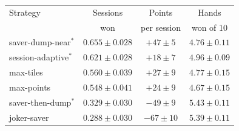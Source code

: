 \begin{tabular}{@{}lccc@{}}\toprule
Strategy & Sessions & Points & Hands\\
 & won & per session & won of 10\\\midrule
saver-dump-near$^*$ & $0.655\pm0.028$ & $+47\pm5$ & $4.76\pm0.11$\\
session-adaptive$^*$ & $0.621\pm0.028$ & $+18\pm7$ & $4.96\pm0.09$\\
max-tiles & $0.560\pm0.039$ & $+27\pm9$ & $4.77\pm0.15$\\
max-points & $0.548\pm0.041$ & $+24\pm9$ & $4.67\pm0.15$\\
saver-then-dump$^*$ & $0.329\pm0.030$ & $-49\pm9$ & $5.43\pm0.11$\\
joker-saver & $0.288\pm0.030$ & $-67\pm10$ & $5.39\pm0.11$\\
\bottomrule
\end{tabular}
